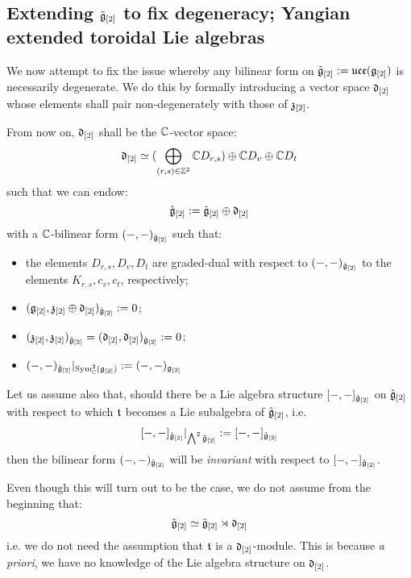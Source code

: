     \subsection{Extending \texorpdfstring{$\tilde{\mathfrak{g}}_{[2]}$}{} to fix degeneracy; Yangian extended toroidal Lie algebras} \label{subsection: extended_toroidal_lie_algebras}
        We now attempt to fix the issue whereby any bilinear form on $\tilde{\mathfrak{g}}_{[2]}:= \mathfrak{uce}(\mathfrak{g}_{[2]})$ is necessarily degenerate. We do this by formally introducing a  vector space $\mathfrak{d}_{[2]}$ whose elements shall pair non-degenerately with those of $\mathfrak{z}_{[2]}$. 
        \begin{convention} \label{conv: orthogonal_complement_of_toroidal_centres}
            From now on, $\mathfrak{d}_{[2]}$ shall be the $\mathbb{C}$-vector space:
                $$\mathfrak{d}_{[2]} \simeq ( \bigoplus_{(r, s) \in \mathbb{Z}^2} \mathbb{C} D_{r, s} ) \oplus \mathbb{C} D_v \oplus \mathbb{C} D_t$$
            such that we can endow:
                $$\hat{\mathfrak{g}}_{[2]} := \tilde{\mathfrak{g}}_{[2]}\oplus \mathfrak{d}_{[2]}$$
            with a $\mathbb{C}$-bilinear form $(-, -)_{\hat{\mathfrak{g}}_{[2]}}$ such that:
            \begin{itemize}
                \item the elements $D_{r, s}, D_v, D_t$ are graded-dual with respect to $(-, -)_{\hat{\mathfrak{g}}_{[2]}}$ to the elements $K_{r, s}, c_v, c_t$, respectively;
                \item $(\mathfrak{g}_{[2]}, \mathfrak{z}_{[2]} \oplus \mathfrak{d}_{[2]})_{\hat{\mathfrak{g}}_{[2]}} := 0$;
                \item $(\mathfrak{z}_{[2]}, \mathfrak{z}_{[2]})_{\hat{\mathfrak{g}}_{[2]}} = (\mathfrak{d}_{[2]}, \mathfrak{d}_{[2]})_{\hat{\mathfrak{g}}_{[2]}} := 0$;
                \item $(-, -)_{\hat{\mathfrak{g}}_{[2]}}|_{\mathrm{Sym}^2_{\mathbb{C}}(\mathfrak{g}_{[2]})} := (-, -)_{\mathfrak{g}_{[2]}}$
            \end{itemize}
        \end{convention}
        \begin{convention}
            Let us assume also that, should there be a Lie algebra structure $[-, -]_{\hat{\mathfrak{g}}_{[2]}}$ on $\hat{\mathfrak{g}}_{[2]}$ with respect to which $\mathfrak{t}$ becomes a Lie subalgebra of $\hat{\mathfrak{g}}_{[2]}$, i.e.
                $$[-, -]_{\hat{\mathfrak{g}}_{[2]}}|_{\bigwedge^2 \tilde{\mathfrak{g}}_{[2]}} := [-, -]_{\tilde{\mathfrak{g}}_{[2]}}$$
            then the bilinear form $(-, -)_{\hat{\mathfrak{g}}_{[2]}}$ will be \textit{invariant} with respect to $[-, -]_{\hat{\mathfrak{g}}_{[2]}}$.

            Even though this will turn out to be the case, we do not assume from the beginning that:
                $$\hat{\mathfrak{g}}_{[2]} \simeq \tilde{\mathfrak{g}}_{[2]}\rtimes \mathfrak{d}_{[2]}$$
            i.e. we do not need the assumption that $\mathfrak{t}$ is a $\mathfrak{d}_{[2]}$-module. This is because \textit{a priori}, we have no knowledge of the Lie algebra structure on $\mathfrak{d}_{[2]}$.
        \end{convention}

